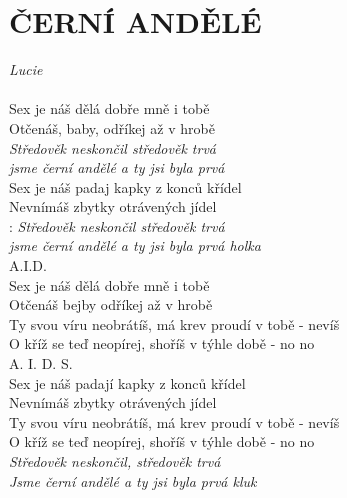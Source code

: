 \section*{\Huge ČERNÍ ANDĚLÉ}
\emph{Lucie}\\

\\
Sex je náš dělá dobře mně i tobě\\
Otčenáš, baby, odříkej až v hrobě\\
\emph{Středověk neskončil středověk trvá\\
jsme černí andělé a ty jsi byla prvá}\\

Sex je náš padaj kapky z konců křídel\\
Nevnímáš zbytky otrávených jídel\\

\textregistered: \emph{Středověk neskončil středověk trvá\\
jsme černí andělé a ty jsi byla prvá holka}\\

A.I.D.\\
Sex je náš dělá dobře mně i tobě\\
Otčenáš bejby odříkej až v hrobě\\
Ty svou víru neobrátíš, má krev proudí v tobě - nevíš\\
O kříž se teď neopírej, shoříš v týhle době - no no \textregistered\\

A. I. D. S.\\
Sex je náš padají kapky z konců křídel\\
Nevnímáš zbytky otrávených jídel\\
Ty svou víru neobrátíš, má krev proudí v tobě - nevíš\\
O kříž se teď neopírej, shoříš v týhle době - no no \textregistered \textregistered\\

\emph{Středověk neskončil, středověk trvá\\
Jsme černí andělé a ty jsi byla prvá kluk}

\newpage
